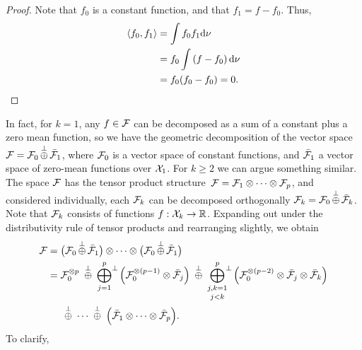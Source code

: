 \begin{proof}
  Note that $f_0$ is a constant function, and that $f_1 = f- f_0$.
  Thus,
  \begin{align*}
    \langle f_0,f_1\rangle 
    &= \int f_0f_1 \text{d}\nu \\
    &= f_0 \int \left(f - f_0\right) \text{d}\nu \\
    &= f_0 (f_0 - f_0) = 0.
  \end{align*}
\end{proof}

In fact, for $k=1$, any $f \in {\mathcal F}$ can be decomposed as a sum of a constant plus a zero mean function, so we have the geometric decomposition of the vector space ${\mathcal F} = {\mathcal F}_0 \displaystyle\mathop{\oplus}^\bot \bar{{\mathcal F}}_1$, where ${\mathcal F}_0$ is a vector space of constant functions, and $\bar{{\mathcal F}}_1$ a vector space of zero-mean functions over ${\mathcal X}_1$.
For $k\geq 2$ we can argue something similar.
The space ${\mathcal F}$ has the tensor product structure\footnotemark~${\mathcal F} = {\mathcal F}_1 \otimes \cdots \otimes {\mathcal F}_p$, and considered individually, each ${\mathcal F}_k$ can be decomposed orthogonally ${\mathcal F}_k = {\mathcal F}_{0} \displaystyle\mathop{\oplus}^\bot \bar{{\mathcal F}}_k$.
Note that ${\mathcal F}_k$ consists of functions $f:{\mathcal X}_k\to\mathbb{R}$.
Expanding out under the distributivity rule of tensor products and rearranging slightly, we obtain
\begin{align}
  \cF &= \big( \cF_0 \mathop{\oplus}^\bot \bar\cF_1 \big) \otimes \cdots \otimes 
  \big( \cF_0 \mathop{\oplus}^\bot \bar\cF_1 \big) \nonumber \\
  &= \cF_{0}^{\otimes p} 
  \ \mathop{\oplus}^\bot \
  \bigoplus_{j=1}^p \! \mathop{\vphantom\oplus}^\bot \Big( \cF_0^{\otimes (p-1)} \otimes \bar\cF_j \Big) 
  \ \mathop{\oplus}^\bot \
  \mathop{\bigoplus_{j,k=1}^p}_{j<k} \!\! \mathop{\vphantom\oplus}^\bot  \Big( \cF_0^{\otimes (p-2)} \otimes \bar\cF_j \otimes \bar\cF_k \Big)
  \label{eq:funcanovaspace} \\
  &\phantom{==} \mathop{\oplus}^\bot \ 
  \cdots 
  \ \mathop{\oplus}^\bot \ 
  \Big( \bar\cF_1 \otimes \cdots \otimes \bar\cF_p \Big). \nonumber
\end{align}
To clarify,
